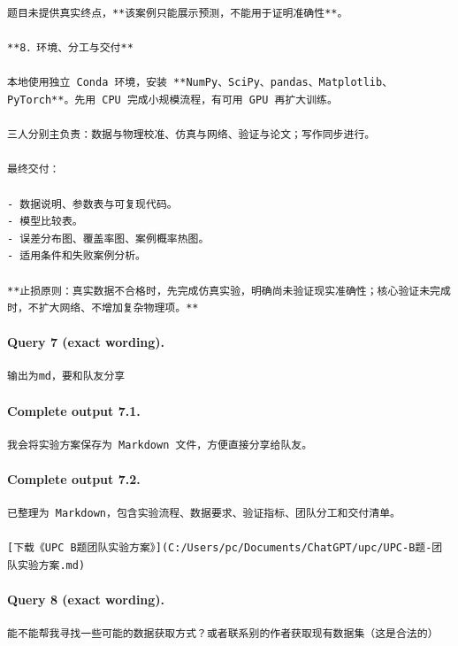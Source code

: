 \documentclass[UTF8,10pt]{ctexart}
\begin{document}
\begin{Verbatim}[breaklines=true,breakanywhere=true,fontsize=\scriptsize,frame=single,framesep=2pt]
题目未提供真实终点，**该案例只能展示预测，不能用于证明准确性**。

**8．环境、分工与交付**

本地使用独立 Conda 环境，安装 **NumPy、SciPy、pandas、Matplotlib、PyTorch**。先用 CPU 完成小规模流程，有可用 GPU 再扩大训练。

三人分别主负责：数据与物理校准、仿真与网络、验证与论文；写作同步进行。

最终交付：

- 数据说明、参数表与可复现代码。
- 模型比较表。
- 误差分布图、覆盖率图、案例概率热图。
- 适用条件和失败案例分析。

**止损原则：真实数据不合格时，先完成仿真实验，明确尚未验证现实准确性；核心验证未完成时，不扩大网络、不增加复杂物理项。**
\end{Verbatim}

\paragraph{Query 7 (exact wording).}
\begin{Verbatim}[breaklines=true,breakanywhere=true,fontsize=\scriptsize,frame=single,framesep=2pt]
输出为md，要和队友分享
\end{Verbatim}

\paragraph{Complete output 7.1.}
\begin{Verbatim}[breaklines=true,breakanywhere=true,fontsize=\scriptsize,frame=single,framesep=2pt]
我会将实验方案保存为 Markdown 文件，方便直接分享给队友。
\end{Verbatim}

\paragraph{Complete output 7.2.}
\begin{Verbatim}[breaklines=true,breakanywhere=true,fontsize=\scriptsize,frame=single,framesep=2pt]
已整理为 Markdown，包含实验流程、数据要求、验证指标、团队分工和交付清单。

[下载《UPC B题团队实验方案》](C:/Users/pc/Documents/ChatGPT/upc/UPC-B题-团队实验方案.md)
\end{Verbatim}

\paragraph{Query 8 (exact wording).}
\begin{Verbatim}[breaklines=true,breakanywhere=true,fontsize=\scriptsize,frame=single,framesep=2pt]
能不能帮我寻找一些可能的数据获取方式？或者联系别的作者获取现有数据集（这是合法的）
\end{Verbatim}
\end{document}
